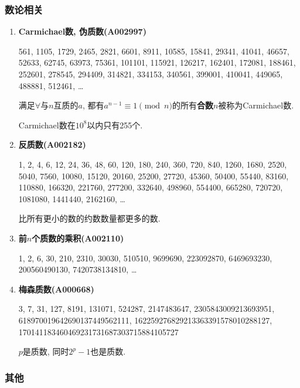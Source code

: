 \subsubsection{数论相关}

\begin{enumerate}

\item \textbf{Carmichael数, 伪质数(A002997)}

561, 1105, 1729, 2465, 2821, 6601, 8911, 10585, 15841, 29341, 41041, 46657, 52633, 62745, 63973, 75361, 101101, 115921, 126217, 162401, 172081, 188461, 252601, 278545, 294409, 314821, 334153, 340561, 399001, 410041, 449065, 488881, 512461, \dots

满足$\forall$与$n$互质的$a$, 都有$a ^ {n - 1} \equiv 1 \pmod n$的所有\textbf{合数}$n$被称为Carmichael数.

Carmichael数在$10^8$以内只有255个.

\item \textbf{反质数(A002182)}

1, 2, 4, 6, 12, 24, 36, 48, 60, 120, 180, 240, 360, 720, 840, 1260, 1680, 2520, 5040, 7560, 10080, 15120, 20160, 25200, 27720, 45360, 50400, 55440, 83160, 110880, 166320, 221760, 277200, 332640, 498960, 554400, 665280, 720720, 1081080, 1441440, 2162160, \dots

比所有更小的数的约数数量都更多的数.

\item \textbf{前$n$个质数的乘积(A002110)}

1, 2, 6, 30, 210, 2310, 30030, 510510, 9699690, 223092870, 6469693230, 200560490130, 7420738134810, \dots

\item \textbf{梅森质数(A000668)}

3, 7, 31, 127, 8191, 131071, 524287, 2147483647, 2305843009213693951, 618970019642690137449562111, 162259276829213363391578010288127,\\170141183460469231731687303715884105727

$p$是质数, 同时$2^p - 1$也是质数.

\end{enumerate}

\subsubsection{其他}


